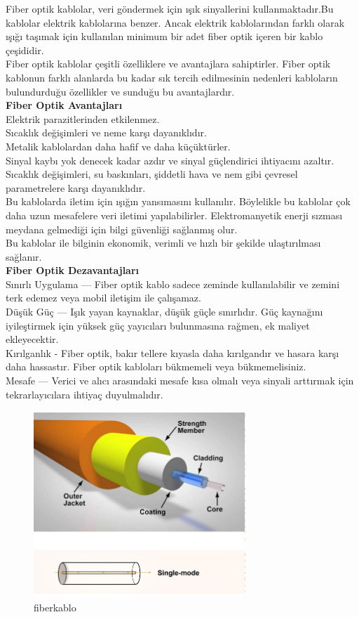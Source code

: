 Fiber optik kablolar, veri göndermek için ışık sinyallerini kullanmaktadır.Bu kablolar elektrik kablolarına benzer. Ancak elektrik kablolarından farklı olarak ışığı taşımak için kullanılan minimum bir adet fiber optik içeren bir kablo çeşididir.\\
Fiber optik kablolar çeşitli özelliklere ve avantajlara sahiptirler. Fiber optik kablonun farklı alanlarda  bu kadar sık tercih edilmesinin nedenleri kabloların bulundurduğu özellikler ve sunduğu bu avantajlardır. \\
\textbf{Fiber Optik Avantajları}\\
Elektrik parazitlerinden etkilenmez.\\
Sıcaklık değişimleri ve neme karşı dayanıklıdır.\\
Metalik kablolardan daha hafif ve daha küçüktürler.\\
Sinyal kaybı yok denecek kadar azdır ve sinyal güçlendirici ihtiyacını azaltır.\\
Sıcaklık değişimleri, su baskınları, şiddetli hava ve nem gibi çevresel parametrelere karşı dayanıklıdır.\\
Bu kablolarda iletim için ışığın yansımasını kullanılır. Böylelikle bu kablolar çok daha uzun mesafelere veri iletimi yapılabilirler.
Elektromanyetik enerji sızması meydana gelmediği için bilgi güvenliği sağlanmış olur.\\
Bu kablolar ile bilginin ekonomik, verimli ve hızlı bir şekilde ulaştırılması sağlanır.\\
\textbf{Fiber Optik Dezavantajları}\\
Sınırlı Uygulama — Fiber optik kablo sadece zeminde kullanılabilir ve zemini terk edemez veya mobil iletişim ile çalışamaz.\\
Düşük Güç — Işık yayan kaynaklar, düşük güçle sınırlıdır. Güç kaynağını iyileştirmek için yüksek güç yayıcıları bulunmasına rağmen, ek maliyet ekleyecektir.\\
Kırılganlık - Fiber optik, bakır tellere kıyasla daha kırılgandır ve hasara karşı daha hassastır. Fiber optik kabloları bükmemeli veya bükmemelisiniz.\\
Mesafe — Verici ve alıcı arasındaki mesafe kısa olmalı veya sinyali arttırmak için tekrarlayıcılara ihtiyaç duyulmalıdır.\\

\begin{figure}[H]
    \centering
    \includegraphics[width=8cm]{images/fiberoptik}
    \caption{fiberkablo}
    \label{fig:fiberoptikkablo}
\end{figure}

